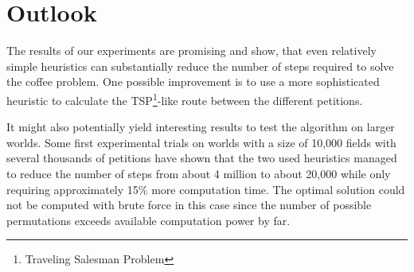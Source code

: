 \newpage
\section{Outlook}

The results of our experiments are promising and show, that even relatively simple heuristics can substantially reduce the number of steps  required to solve the coffee problem. One possible improvement is to use a more sophisticated heuristic to calculate the TSP\footnote{Traveling Salesman Problem}-like route between the different petitions. 

It might also potentially yield interesting results to test the algorithm on larger worlds. Some first experimental trials on worlds with a size of 10,000 fields with several thousands of petitions have shown that the two used heuristics managed to reduce the number of steps from about 4 million to about 20,000 while only requiring approximately 15\% more computation time. The optimal solution could not be computed with brute force in this case since the number of possible permutations exceeds available computation power by far.